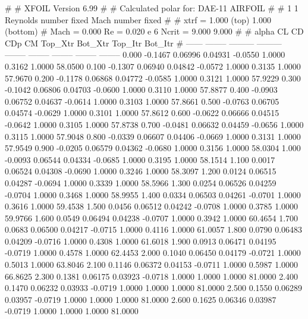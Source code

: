 #  
#       XFOIL         Version 6.99
#  
# Calculated polar for: DAE-11 AIRFOIL                                  
#  
# 1 1 Reynolds number fixed          Mach number fixed         
#  
# xtrf =   1.000 (top)        1.000 (bottom)  
# Mach =   0.000     Re =     0.020 e 6     Ncrit =   9.000  9.000
#  
#   alpha    CL        CD       CDp       CM     Top_Xtr  Bot_Xtr  Top_Itr  Bot_Itr
#  ------ -------- --------- --------- -------- -------- -------- -------- --------
   0.000  -0.1467   0.06996   0.04931  -0.0550   1.0000   0.3162   1.0000  58.0500
   0.100  -0.1307   0.06940   0.04842  -0.0572   1.0000   0.3135   1.0000  57.9670
   0.200  -0.1178   0.06868   0.04772  -0.0585   1.0000   0.3121   1.0000  57.9229
   0.300  -0.1042   0.06806   0.04703  -0.0600   1.0000   0.3110   1.0000  57.8877
   0.400  -0.0903   0.06752   0.04637  -0.0614   1.0000   0.3103   1.0000  57.8661
   0.500  -0.0763   0.06705   0.04574  -0.0629   1.0000   0.3101   1.0000  57.8612
   0.600  -0.0622   0.06666   0.04515  -0.0642   1.0000   0.3105   1.0000  57.8738
   0.700  -0.0481   0.06632   0.04459  -0.0656   1.0000   0.3115   1.0000  57.9048
   0.800  -0.0339   0.06607   0.04406  -0.0669   1.0000   0.3131   1.0000  57.9549
   0.900  -0.0205   0.06579   0.04362  -0.0680   1.0000   0.3156   1.0000  58.0304
   1.000  -0.0093   0.06544   0.04334  -0.0685   1.0000   0.3195   1.0000  58.1514
   1.100   0.0017   0.06524   0.04308  -0.0690   1.0000   0.3246   1.0000  58.3097
   1.200   0.0124   0.06515   0.04287  -0.0694   1.0000   0.3339   1.0000  58.5966
   1.300   0.0254   0.06526   0.04259  -0.0704   1.0000   0.3468   1.0000  58.9955
   1.400   0.0334   0.06503   0.04261  -0.0701   1.0000   0.3616   1.0000  59.4538
   1.500   0.0456   0.06512   0.04242  -0.0708   1.0000   0.3785   1.0000  59.9766
   1.600   0.0549   0.06494   0.04238  -0.0707   1.0000   0.3942   1.0000  60.4654
   1.700   0.0683   0.06500   0.04217  -0.0715   1.0000   0.4116   1.0000  61.0057
   1.800   0.0790   0.06483   0.04209  -0.0716   1.0000   0.4308   1.0000  61.6018
   1.900   0.0913   0.06471   0.04195  -0.0719   1.0000   0.4578   1.0000  62.4453
   2.000   0.1040   0.06450   0.04179  -0.0721   1.0000   0.5013   1.0000  63.8046
   2.100   0.1146   0.06372   0.04153  -0.0711   1.0000   0.5987   1.0000  66.8625
   2.300   0.1381   0.06175   0.03923  -0.0718   1.0000   1.0000   1.0000  81.0000
   2.400   0.1470   0.06232   0.03933  -0.0719   1.0000   1.0000   1.0000  81.0000
   2.500   0.1550   0.06289   0.03957  -0.0719   1.0000   1.0000   1.0000  81.0000
   2.600   0.1625   0.06346   0.03987  -0.0719   1.0000   1.0000   1.0000  81.0000
